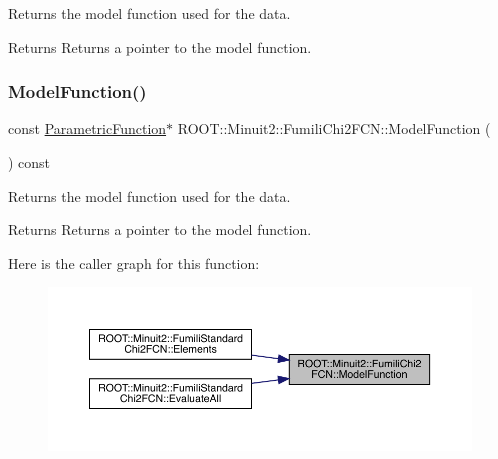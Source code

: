 Returns the model function used for the data.

\begin{DoxyReturn}{Returns}
Returns a pointer to the model function. 
\end{DoxyReturn}
\mbox{\label{classROOT_1_1Minuit2_1_1FumiliChi2FCN_a3d31739e476a413e0c5616bb0c6283b9}} 
\subsubsection{\texorpdfstring{ModelFunction()}{ModelFunction()}\hspace{0.1cm}{\footnotesize\ttfamily [2/2]}}
{\footnotesize\ttfamily const \mbox{\hyperlink{classROOT_1_1Minuit2_1_1ParametricFunction}{Parametric\+Function}}$\ast$ R\+O\+O\+T\+::\+Minuit2\+::\+Fumili\+Chi2\+F\+C\+N\+::\+Model\+Function (\begin{DoxyParamCaption}{ }\end{DoxyParamCaption}) const\hspace{0.3cm}{\ttfamily [inline]}}

Returns the model function used for the data.

\begin{DoxyReturn}{Returns}
Returns a pointer to the model function. 
\end{DoxyReturn}
Here is the caller graph for this function\+:\nopagebreak
\begin{figure}[H]
\begin{center}
\leavevmode
\includegraphics[width=350pt]{d3/df0/classROOT_1_1Minuit2_1_1FumiliChi2FCN_a3d31739e476a413e0c5616bb0c6283b9_icgraph}
\end{center}
\end{figure}
\mbox{\label{classROOT_1_1Minuit2_1_1FumiliChi2FCN_ae7b2c2080162c0b946cf54090b712716}} 
